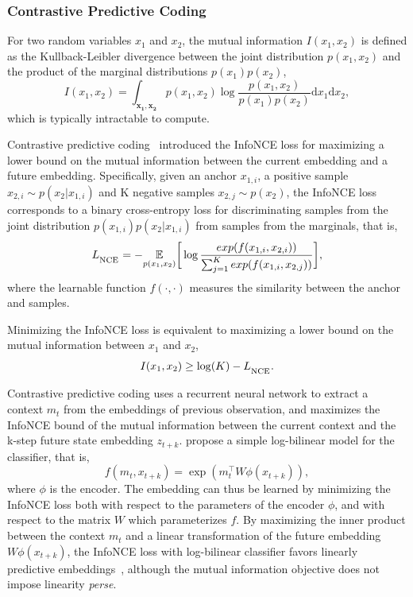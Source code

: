 \documentclass[a4paper,12pt]{article}
\begin{document}
\subsubsection{Contrastive Predictive Coding}
For two random variables $x_1$ and $x_2$, the mutual information $I(x_1, x_2)$ is defined as the Kullback-Leibler divergence between the joint distribution $p(x_1, x_2)$ and the product of the marginal distributions $p(x_1) p(x_2)$, 
\begin{equation*}
    I(x_1, x_2) = \int_{\mathbf{x_1},\mathbf{x_2}} p(x_1,x_2) \log \frac{p(x_1, x_2)}{p(x_1) p(x_2)} \mathrm{d}x_1\mathrm{d}x_2,
\end{equation*}
which is typically intractable to compute.

Contrastive predictive coding~\cite{oord2018} introduced the InfoNCE loss for maximizing a lower bound on the mutual information between the current embedding and a future embedding.
Specifically, given an anchor $x_{1,i}$, a positive sample $x_{2,i} \sim p(x_2 | x_{1,i})$ and K negative samples $x_{2,j} \sim p(x_2)$, the InfoNCE loss corresponds to a binary cross-entropy loss for discriminating samples from the joint distribution $p(x_{1,i}) p(x_2 | x_{1,i})$ from samples from the marginals, that is, 
\begin{equation}\label{eq:InfoNCE loss}
     L_{\textsubscript{NCE}} = - \underset{p(x_1,x_2)}{\mathbb{E}} \bigg[\log\frac{exp(f(x_{1,i}, x_{2,i}))}{\sum_{j=1}^K exp(f(x_{1,i}, x_{2,j}))} \bigg],
\end{equation}
where the learnable function $f(\cdot,\cdot)$ measures the similarity between the anchor and samples. 

Minimizing the InfoNCE loss is equivalent to maximizing a lower bound on the mutual information between $x_1$ and $x_2$,
\begin{equation}
    I(x_1,x_2) \geq \log(K) - L_{\textsubscript{NCE}}.
\end{equation}

Contrastive predictive coding uses a recurrent neural network to extract a context $m_t$ from the embeddings of previous observation, and maximizes the InfoNCE bound of the mutual information between the current context and the k-step future state embedding $z_{t+k}$. \citet{oord2018} propose a simple log-bilinear model for the classifier, that is, $$f(m_t, x_{t+k}) = \exp{\left(m_t^\top W  \phi(x_{t+k})\right)},$$ where $\phi$ is the encoder. The embedding can thus be learned by minimizing the InfoNCE loss both with respect to the parameters of the encoder $\phi$, and with respect to the matrix $W$ which parameterizes $f$. By maximizing the inner product between the context $m_t$ and a linear transformation of the future embedding $W\phi(x_{t+k})$, the InfoNCE loss with log-bilinear classifier favors linearly predictive embeddings~\cite{anand2019unsupervised}, although the mutual information objective does not impose linearity \emph{perse}.
\end{document}
